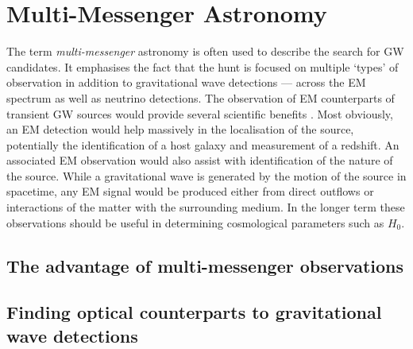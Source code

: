 
\newpage
\section{Multi-Messenger Astronomy}
\label{sec:multi}
\begin{colsection}


\begin{colsection}


The term \emph{multi-messenger} astronomy is often used to describe the search for GW candidates. It emphasises the fact that the hunt is focused on multiple `types' of observation in addition to gravitational wave detections --- across the EM spectrum as well as neutrino detections. The observation of EM counterparts of transient GW sources would provide several scientific benefits \citep{LIGO-EM, LIGO-firstrun-2012}. Most obviously, an EM detection would help massively in the localisation of the source, potentially the identification of a host galaxy and measurement of a redshift. An associated EM observation would also assist with identification of the nature of the source. While a gravitational wave is generated by the motion of the source in spacetime, any EM signal would be produced either from direct outflows or interactions of the matter with the surrounding medium. In the longer term these observations should be useful in determining cosmological parameters such as $H_0$.

\end{colsection}


\subsection{The advantage of multi-messenger observations}
\label{sec:mma_advantages}
\begin{colsection}


\end{colsection}


\subsection{Finding optical counterparts to gravitational wave detections}
\label{sec:followup}
\begin{colsection}


\end{colsection}
\end{colsection}
